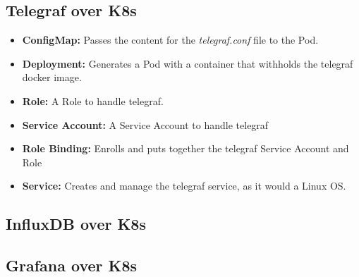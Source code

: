 \newpage
\subsection{Telegraf over K8s}
\begin{itemize}
  \item \textbf{ConfigMap:} Passes the content for the \textit{telegraf.conf} file to the Pod.
  \item \textbf{Deployment:} Generates a Pod with a container that withholds the telegraf docker image.
  \item \textbf{Role:} A Role to handle telegraf.
  \item \textbf{Service Account:} A Service Account to handle telegraf
  \item \textbf{Role Binding:} Enrolls and puts together the telegraf Service Account and Role
  \item \textbf{Service:} Creates and manage the telegraf service, as it would a Linux OS.
\end{itemize}
\subsection{InfluxDB over K8s}

\subsection{Grafana over K8s}

\newpage